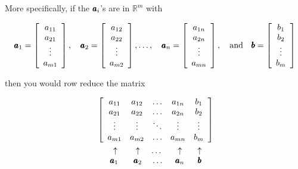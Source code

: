 More specifically, if the $\pmb{a}_i$'s are in $\mathbb{R}^m$ with

\[
\pmb{a}_1 = \left[\begin{array}{c}
a_{11} \\
a_{21} \\
\vdots \\
a_{m1}
\end{array}\right], \quad \pmb{a}_2 = \left[\begin{array}{c}
a_{12} \\
a_{22} \\
\vdots \\
a_{m2}
\end{array}\right], \ldots, \quad \pmb{a}_n = \left[\begin{array}{c}
a_{1n} \\
a_{2n} \\
\vdots \\
a_{mn}
\end{array}\right], \quad \text{and} \quad \pmb{b} = \left[\begin{array}{c}
b_1 \\
b_2 \\
\vdots \\
b_m
\end{array}\right]
\]

then you would row reduce the matrix

\[
\begin{aligned}
& \left[\begin{array}{ccccc}
a_{11} & a_{12} & \ldots & a_{1n} & b_1 \\
a_{21} & a_{22} & \ldots & a_{2n} & b_2 \\
\vdots & \vdots & \ddots & \vdots & \vdots \\
a_{m1} & a_{m2} & \ldots & a_{mn} & b_m
\end{array}\right] \\
& \begin{array}{ccccc}
\hspace{0.5cm} \uparrow & \hspace{0.3cm} \uparrow & \hspace{0.0cm} \ldots & \hspace{0.2cm} \uparrow & \hspace{0.2cm} \uparrow \\
\hspace{0.4cm} \pmb{a}_1 & \hspace{0.3cm} \pmb{a}_2 & \hspace{0.1cm} \ldots & \hspace{0.2cm} \pmb{a}_n & \hspace{0.2cm} \pmb{b}
\end{array}
\end{aligned}
\]

